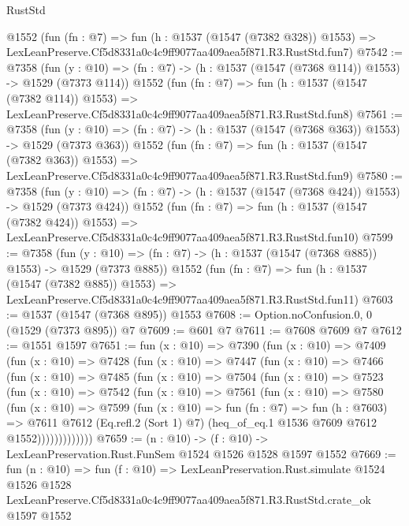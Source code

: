 \begin{lexlean}{RustStd}
\begin{coremodule}
    @1552
    (fun (fn : @7) =>
    fun (h : @1537 (@1547 (@7382 @328)) @1553) =>
    LexLeanPreserve.Cf5d8331a0c4c9ff9077aa409aea5f871.R3.RustStd.fun7)
@7542 := @7358
    (fun (y : @10) => (fn : @7) -> (h : @1537 (@1547 (@7368 @114)) @1553) -> @1529 (@7373 @114))
    @1552
    (fun (fn : @7) =>
    fun (h : @1537 (@1547 (@7382 @114)) @1553) =>
    LexLeanPreserve.Cf5d8331a0c4c9ff9077aa409aea5f871.R3.RustStd.fun8)
@7561 := @7358
    (fun (y : @10) => (fn : @7) -> (h : @1537 (@1547 (@7368 @363)) @1553) -> @1529 (@7373 @363))
    @1552
    (fun (fn : @7) =>
    fun (h : @1537 (@1547 (@7382 @363)) @1553) =>
    LexLeanPreserve.Cf5d8331a0c4c9ff9077aa409aea5f871.R3.RustStd.fun9)
@7580 := @7358
    (fun (y : @10) => (fn : @7) -> (h : @1537 (@1547 (@7368 @424)) @1553) -> @1529 (@7373 @424))
    @1552
    (fun (fn : @7) =>
    fun (h : @1537 (@1547 (@7382 @424)) @1553) =>
    LexLeanPreserve.Cf5d8331a0c4c9ff9077aa409aea5f871.R3.RustStd.fun10)
@7599 := @7358
    (fun (y : @10) => (fn : @7) -> (h : @1537 (@1547 (@7368 @885)) @1553) -> @1529 (@7373 @885))
    @1552
    (fun (fn : @7) =>
    fun (h : @1537 (@1547 (@7382 @885)) @1553) =>
    LexLeanPreserve.Cf5d8331a0c4c9ff9077aa409aea5f871.R3.RustStd.fun11)
@7603 := @1537 (@1547 (@7368 @895)) @1553
@7608 := Option.noConfusion.{0, 0} (@1529 (@7373 @895)) @7
@7609 := @601 @7
@7611 := @7608 @7609 @7
@7612 := @1551 @1597
@7651 := fun (x : @10) =>
  @7390
    (fun (x : @10) =>
    @7409
      (fun (x : @10) =>
      @7428
        (fun (x : @10) =>
        @7447
          (fun (x : @10) =>
          @7466
            (fun (x : @10) =>
            @7485
              (fun (x : @10) =>
              @7504
                (fun (x : @10) =>
                @7523
                  (fun (x : @10) =>
                  @7542
                    (fun (x : @10) =>
                    @7561
                      (fun (x : @10) =>
                      @7580
                        (fun (x : @10) =>
                        @7599
                          (fun (x : @10) =>
                          fun (fn : @7) =>
                          fun (h : @7603) =>
                          @7611
                            @7612
                            (Eq.refl.{2} (Sort 1) @7)
                            (heq_of_eq.{1} @1536 @7609 @7612 @1552)))))))))))))
@7659 := (n : @10) -> (f : @10) -> LexLeanPreservation.Rust.FunSem @1524 @1526 @1528 @1597 @1552
@7669 := fun (n : @10) =>
  fun (f : @10) =>
  LexLeanPreservation.Rust.simulate
    @1524
    @1526
    @1528
    LexLeanPreserve.Cf5d8331a0c4c9ff9077aa409aea5f871.R3.RustStd.crate_ok
    @1597
    @1552
\end{coremodule}
\end{lexlean}
